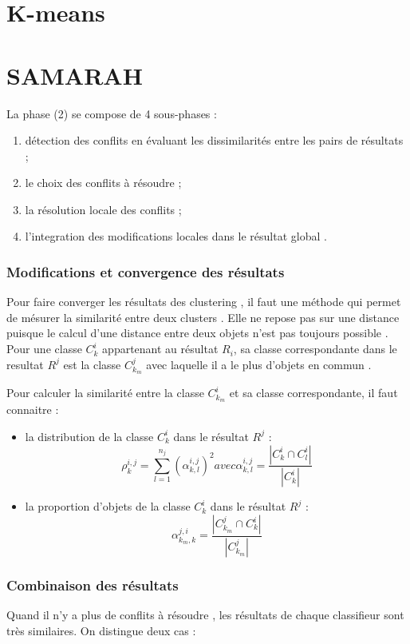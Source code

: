 \documentclass[11pt, openany]{report}
\begin{document}
\section{K-means}

\section{SAMARAH}

La phase (2)  se compose de 4 sous-phases :

\begin{enumerate}
 \item  détection des conflits  en évaluant les dissimilarités entre les pairs de résultats  ;
  \item le choix des conflits à résoudre ;
   \item la résolution locale des conflits ;
    \item l'integration des modifications locales dans le résultat global .
\end{enumerate}


\subsubsection{Modifications et convergence des résultats}
\setlength{\parindent}{0in}
Pour faire converger les résultats des clustering , il faut une méthode qui permet de mésurer la similarité entre deux clusters . Elle ne repose pas sur une distance  puisque le calcul d'une distance entre deux objets n'est pas toujours possible . Pour une classe $C_{k}^i$ appartenant au résultat $R_i$, sa classe correspondante  dans le resultat $R^j$ est la classe $C_{k_m}^j$ avec laquelle il a le plus d'objets en commun .

Pour calculer la similarité entre la classe $C_{k_m}^i$ et sa classe correspondante, il faut connaitre :

\begin{itemize}
  \item la distribution de la classe $C_k^i$ dans le résultat $R^j$ :
  \[
  		\rho_k^{i,j} = \sum_{l=1}^{n_j} \left( \alpha_{k,l}^{i,j} \right)^2 \mathit{avec}  \alpha_{k,l}^{i,j} = \frac{|C_k^i \cap C_l^i|}{|C_k^i|}
  	\]
   \item la proportion d'objets de la classe $C_k^i$ dans le résultat $R^j$  :
    \[  		
    	\alpha_{{k_m},k}^{j,i} = \frac{|C_{k_m}^j \cap C_k^i|}{|C_{k_m}^j|}
  	\]
\end{itemize}

\subsubsection{Combinaison des résultats}
\setlength{\parindent}{0in} 
Quand il n'y a plus de conflits à résoudre , les résultats de chaque classifieur sont très similaires.
On distingue deux cas : 
\end{document}
